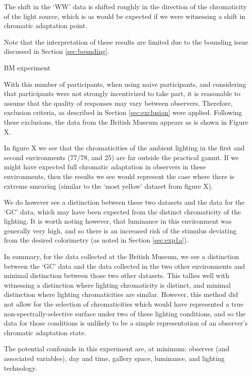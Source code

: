 The shift in the `WW' data is shifted roughly in the direction of the chromaticity of the light source, which is as would be expected if we were witnessing a shift in chromatic adaptation point.

Note that the interpretation of these results are limited due to the bounding issue discussed in Section \ref{sec:bounding}.

BM experiment


With this number of participants, when using naive participants, and considering that participants were not strongly incentivized to take part, it is reasonable to assume that the quality of responses may vary between observers. Therefore, exclusion criteria, as described in Section \ref{sec:exclusion} were applied. Following these exclusions, the data from the British Museum appears as is shown in Figure X. 

In figure X we see that the chromaticities of the ambient lighting in the first and second environments (77/78, and 25) are far outside the practical gamut. If we might have expected full chromatic adaptation in observers in these environments, then the results we see would represent the case where there is extreme smearing (similar to the `most yellow' dataset from figure X). 

We do however see a distinction between these two datasets and the data for the `GC' data, which may have been expected from the distinct chromaticity of the lighting. It is worth noting however, that luminance in this environment was generally very high, and so there is an increased risk of the stimulus deviating from the desired colorimetry (as noted in Section \ref{sec:exp1a}).

In summary, for the data collected at the British Museum, we see a distinction between the `GC' data and the data collected in the two other environments and minimal distinction between those two other datasets. This tallies well with witnessing a distinction where lighting chromaticity is distinct, and minimal distinction where lighting chromaticities are similar. However, this method did not allow for the selection of chromaticities which would have represented a true non-spectrally-selective surface under two of these lighting conditions, and so the data for those conditions is unlikely to be a simple representation of an observer's chromatic adaptation state.

The potential confounds in this experiment are, at minimum: observer (and associated variables), day and time, gallery space, luminance, and lighting technology.

